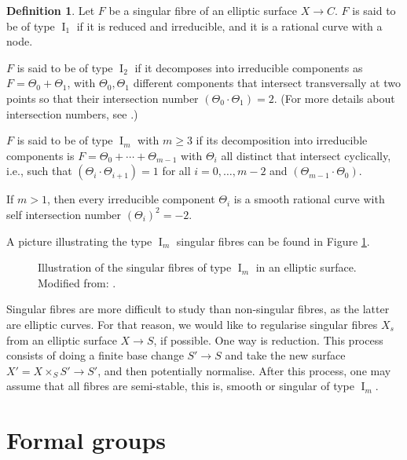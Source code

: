 \documentclass{report}
\DeclareMathOperator{\I}{I}
\theoremstyle{definition}
\newtheorem{definition}[theorem]{Definition}
\begin{document}
\begin{definition}
Let $F$ be a singular fibre of an elliptic surface $X\rightarrow C$. $F$ is said to be of type $\I_1$ if it is reduced and irreducible, and it is a rational curve with a node.

$F$ is said to be of type $\I_2$ if it decomposes into irreducible components as $F=\Theta_0+\Theta_1$, with $\Theta_0,\Theta_1$ different components that intersect transversally at two points so that their intersection number $(\Theta_0\cdot\Theta_1)=2$. (For more details about intersection numbers, see \cite[Lecture~12]{mumford1966lectures}.)

$F$ is said to be of type $\I_m$ with $m\geq3$ if its decomposition into irreducible components is $F=\Theta_0+\cdots+\Theta_{m-1}$ with $\Theta_i$ all distinct that intersect cyclically, i.e., such that $(\Theta_i\cdot\Theta_{i+1})=1$ for all $i=0,\ldots,m-2$ and $(\Theta_{m-1}\cdot\Theta_0)$.

If $m>1$, then every irreducible component $\Theta_i$ is a smooth rational curve with self intersection number $(\Theta_i)^2=-2$.

A picture illustrating the type $\I_m$ singular fibres can be found in Figure \ref{fig:singular-fibres}.
\end{definition}

\begin{figure}
\begin{center}

\caption{Illustration of the singular fibres of type $\I_m$ in an elliptic surface. Modified from: \cite[Figure~5.1]{schuett2019mordell}.}
\label{fig:singular-fibres}
\end{center}
\end{figure} 

Singular fibres are more difficult to study than non-singular fibres, as the latter are elliptic curves. For that reason, we would like to regularise singular fibres $X_s$ from an elliptic surface $X\rightarrow S$, if possible. One way is reduction. This process consists of doing a finite base change $S'\rightarrow S$ and take the new surface $X'=X\times_SS'\rightarrow S'$, and then potentially normalise. After this process, one may assume that all fibres are semi-stable, this is, smooth or singular of type $\I_m$.

\chapter{Formal groups}
\label{Cha:formal-groups}
\end{document}
